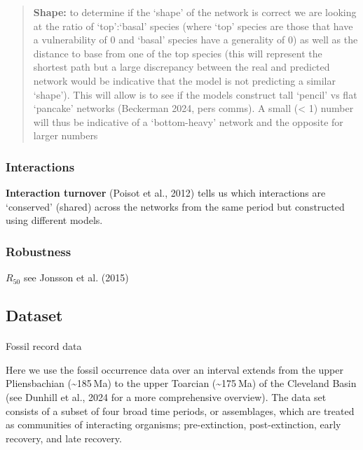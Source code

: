 \documentclass[
]{article}
\makeatletter
\let\oldparagraph\paragraph
\renewcommand{\paragraph}{
    \@ifstar
      \xxxParagraphStar
      \xxxParagraphNoStar
  }
\newcommand{\xxxParagraphStar}[1]{\oldparagraph*{#1}\mbox{}}
\newcommand{\xxxParagraphNoStar}[1]{\oldparagraph{#1}\mbox{}}
\makeatother
\begin{document}
\begin{quote}
\textbf{Shape:} to determine if the `shape' of the network is correct we
are looking at the ratio of `top':`basal' species (where `top' species
are those that have a vulnerability of 0 and `basal' species have a
generality of 0) as well as the distance to base from one of the top
species (this will represent the shortest path but a large discrepancy
between the real and predicted network would be indicative that the
model is not predicting a similar `shape'). This will allow is to see if
the models construct tall `pencil' vs flat `pancake' networks (Beckerman
2024, pers comms). A small (\textless{} 1) number will thus be
indicative of a `bottom-heavy' network and the opposite for larger
numbers
\end{quote}

\subsubsection{Interactions}\label{interactions}

\textbf{Interaction turnover} (Poisot et al., 2012) tells us which
interactions are `conserved' (shared) across the networks from the same
period but constructed using different models.

\subsubsection{Robustness}\label{robustness}

\(R_{50}\) see Jonsson et al. (2015)

\subsection{Dataset}\label{dataset}

\paragraph{Fossil record data}\label{fossil-record-data}

Here we use the fossil occurrence data over an interval extends from the
upper Pliensbachian (\textasciitilde185 Ma) to the upper Toarcian
(\textasciitilde175 Ma) of the Cleveland Basin (see Dunhill et al., 2024
for a more comprehensive overview). The data set consists of a subset of
four broad time periods, or assemblages, which are treated as
communities of interacting organisms; pre-extinction, post-extinction,
early recovery, and late recovery.
\end{document}
